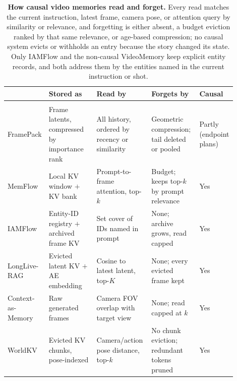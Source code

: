 \begin{table}[t]
\centering
\caption{\textbf{How causal video memories read and forget.}
Every read matches the current instruction, latest frame, camera pose, or attention query by similarity or relevance, and forgetting is either absent, a budget eviction ranked by that same relevance, or age-based compression; no causal system evicts or withholds an entry because the story changed its state. Only IAMFlow and the non-causal VideoMemory keep explicit entity records, and both address them by the entities named in the current instruction or shot.}
\label{tab:memory-read-forget}
\footnotesize
\setlength{\tabcolsep}{4pt}
\renewcommand{\arraystretch}{1.08}
\begin{tabular}{@{}
  >{\raggedright\arraybackslash}p{0.16\linewidth}
  >{\raggedright\arraybackslash}p{0.21\linewidth}
  >{\raggedright\arraybackslash}p{0.24\linewidth}
  >{\raggedright\arraybackslash}p{0.21\linewidth}
  >{\raggedright\arraybackslash}p{0.08\linewidth}
  @{} }
\toprule
{\normalfont\bfseries System}
  & {\normalfont\bfseries Stored as}
  & {\normalfont\bfseries Read by}
  & {\normalfont\bfseries Forgets by}
  & {\normalfont\bfseries Causal} \\
\midrule
\multicolumn{5}{@{}l}{\textit{Released / published memories}} \\
FramePack \citep{zhang2025framepack}
  & Frame latents, compressed by importance rank
  & All history, ordered by recency or similarity
  & Geometric compression; tail deleted or pooled
  & Partly (endpoint plans) \\
MemFlow \citep{ji2025memflow}
  & Local KV window $+$ KV bank
  & Prompt-to-frame attention, top-$k$
  & Budget; keeps top-$k$ by prompt relevance
  & Yes \\
IAMFlow \citep{liu2026iamflow}
  & Entity-ID registry $+$ archived frame KV
  & Set cover of IDs named in prompt
  & None; archive grows, read capped
  & Yes \\
LongLive-RAG \citep{hu2026longliverag}
  & Evicted latent KV $+$ AE embedding
  & Cosine to latest latent, top-$K$
  & None; every evicted frame kept
  & Yes \\
Context-as-Memory \citep{yu2025contextmemory}
  & Raw generated frames
  & Camera FOV overlap with target view
  & None; read capped at $k$
  & Yes \\
WorldKV \citep{yi2026worldkv}
  & Evicted KV chunks, pose-indexed
  & Camera/action pose distance, top-$k$
  & No chunk eviction; redundant tokens pruned
  & Yes \\

\end{tabular}
\end{table}

